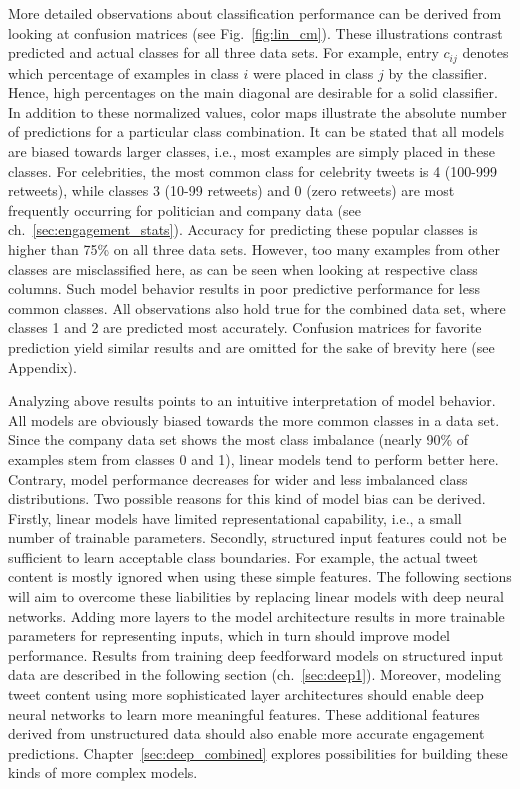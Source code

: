 More detailed observations about classification performance can be derived from
looking at confusion matrices (see Fig.~\ref{fig:lin_cm}).
These illustrations contrast predicted and actual classes for all three data sets.
For example, entry $c_{ij}$ denotes which percentage of examples in class $i$
were placed in class $j$ by the classifier.
Hence, high percentages on the main diagonal are desirable for a solid classifier.
In addition to these normalized values, color maps illustrate the absolute
number of predictions for a particular class combination.
It can be stated that all models are biased towards larger classes, i.e.,
most examples are simply placed in these classes.
For celebrities, the most common class for celebrity tweets is 4 (100-999 retweets), while classes
3 (10-99 retweets) and 0 (zero retweets) are most frequently occurring for politician and company data
(see ch.~\ref{sec:engagement_stats}).
Accuracy for predicting these popular classes is higher than 75\% on all three data sets.
However, too many examples from other classes are misclassified here, as can be
seen when looking at respective class columns.
Such model behavior results in poor predictive performance for less common classes.
All observations also hold true for the combined data set, where classes 1 and 2
are predicted most accurately.
Confusion matrices for favorite prediction yield similar results and are
omitted for the sake of brevity here (see Appendix).

Analyzing above results points to an intuitive interpretation of model behavior.
All models are obviously biased towards the more common classes in a data set.
Since the company data set shows the most class imbalance (nearly 90\% of examples
stem from classes 0 and 1), linear models tend to perform better here.
Contrary, model performance decreases for wider and less imbalanced class distributions.
Two possible reasons for this kind of model bias can be derived.
Firstly, linear models have limited representational capability, i.e., a small
number of trainable parameters.
Secondly, structured input features could not be sufficient to learn acceptable
class boundaries.
For example, the actual tweet content is mostly ignored when using these simple
features.
The following sections will aim to overcome these liabilities by replacing
linear models with deep neural networks.
Adding more layers to the model architecture results in more trainable parameters
for representing inputs, which in turn should improve
model performance.
Results from training deep feedforward models on structured input data are
described in the following section (ch.~\ref{sec:deep1}).
Moreover, modeling tweet content using more sophisticated layer architectures
should enable deep neural networks to learn more meaningful features.
These additional features derived from unstructured data should also enable
more accurate engagement predictions.
Chapter~\ref{sec:deep_combined} explores possibilities for building these kinds
of more complex models.

